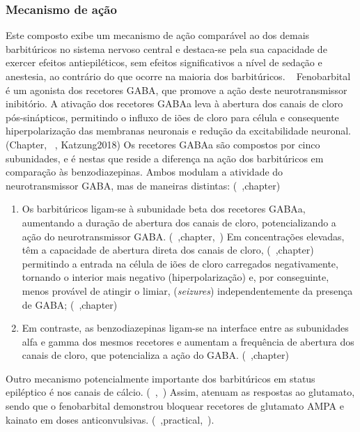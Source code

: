 \subsubsection{Mecanismo de ação}


Este composto exibe um mecanismo de ação comparável ao dos demais barbitúricos no sistema nervoso central e destaca-se pela sua capacidade de exercer efeitos antiepiléticos, sem efeitos significativos a nível de sedação e anestesia, ao contrário do que ocorre na maioria dos barbitúricos. ~\cite{Papich2021}
 Fenobarbital é um agonista dos recetores GABA, que promove a ação deste neurotransmissor inibitório. A ativação dos recetores GABAa leva à abertura dos canais de cloro pós-sinápticos, permitindo o influxo de iões de cloro para célula e consequente hiperpolarização das membranas neuronais e redução da excitabilidade neuronal. (Chapter, ~\cite{Papich2021}, Katzung2018) Os recetores GABAa são compostos por cinco subunidades, e é nestas que reside a diferença na ação dos barbitúricos em comparação às benzodiazepinas. Ambos modulam a atividade do neurotransmissor GABA, mas de maneiras distintas: (~\cite{Trinka2023},chapter)

 \begin{enumerate}
    \item	Os barbitúricos ligam-se à subunidade beta dos recetores GABAa, aumentando a duração de abertura dos canais de cloro, potencializando a ação do neurotransmissor GABA. (~\cite{Trinka2023},chapter,~\cite{Bersan2014}) Em concentrações elevadas, têm a capacidade de abertura direta dos canais de cloro, (~\cite{Trinka2023},chapter) permitindo a entrada na célula de iões de cloro carregados negativamente, tornando o interior mais negativo (hiperpolarização) e, por conseguinte, menos provável de atingir o limiar, (\textit{seizures}) independentemente da presença de GABA; (~\cite{Trinka2023},chapter)
    \item Em contraste, as benzodiazepinas ligam-se na interface entre as subunidades alfa e gamma dos mesmos recetores e aumentam a frequência de abertura dos canais de cloro, que potencializa a ação do GABA. (~\cite{Trinka2023},chapter)
\end{enumerate}

Outro mecanismo potencialmente importante dos barbitúricos em status epiléptico é nos canais de cálcio. (~\cite{Trinka2023},~\cite{Bersan2014}) Assim, atenuam as respostas ao glutamato, sendo que o fenobarbital demonstrou bloquear recetores de glutamato AMPA e kainato em doses anticonvulsivas. (~\cite{Loscher2012},practical,~\cite{Bersan2014}).


